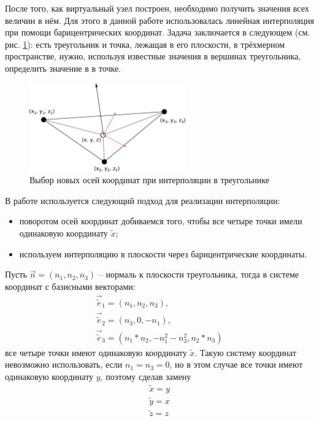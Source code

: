 После того, как виртуальный узел построен, необходимо получить значения всех величин в нём. Для этого в данной работе использовалась линейная интерполяция при помощи барицентрических координат. Задача заключается в следующем (см. рис. \ref{pic:triangle_interpolation}): есть треугольник и точка, лежащая в его плоскости, в трёхмерном пространстве, нужно, используя известные значения в вершинах треугольника, определить значение в в точке.
\begin{figure}[htp]
\centering
\includegraphics[width=0.6\textwidth]{eps/triangle_interpolation.eps}
\caption{Выбор новых осей координат при интерполяции в треугольнике}
\label{pic:triangle_interpolation}
\end{figure}
В работе используется следующий подход для реализации интерполяции:
\begin{itemize}
	\item поворотом осей координат добиваемся того, чтобы все четыре точки имели одинаковую координату $\tilde{x}$;
	\item используем интерполяцию в плоскости через барицентрические координаты.
\end{itemize}
Пусть $\vec{n}=(n_1,n_2,n_3)$ -- нормаль к плоскости треугольника, тогда в системе координат с базисными векторами:
\begin{eqnarray}
\label{eq:new_coords}
\vec{\tilde{e}}_1=(n_1, n_2, n_3), \nonumber \\
\vec{\tilde{e}}_2=(n_3, 0, -n_1), \nonumber \\
\vec{\tilde{e}}_3=(n_1*n_2, -n_1^2-n_3^2, n_2*n_3)
\end{eqnarray}
все четыре точки имеют одинаковую координату $\tilde{x}$. Такую систему координат невозможно использовать, если $n_1=n_3=0$, но в этом случае все точки имеют одинаковую координату $y$, поэтому сделав замену
\begin{eqnarray}
\label{eq:new_coords_2}
\tilde{x}=y \\
\tilde{y}=x \nonumber \\
\tilde{z}=z
\end{eqnarray}
